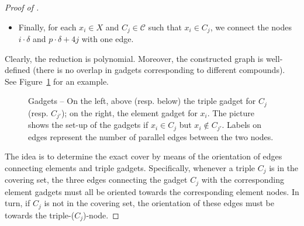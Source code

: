 \documentclass[a4paper]{article}
\begin{document}
\begin{proof}[Proof of ]
\begin{itemize}
    \item Finally, for each $x_i\in X$ and $C_j\in\mathcal{C}$ such that $x_i\in C_j$, we connect the nodes $i\cdot\delta$ and $p\cdot\delta + 4j$ with one edge.
\end{itemize}
Clearly, the reduction is polynomial. Moreover, the constructed graph is well-defined (there is no overlap in gadgets corresponding to different compounds). See Figure~\ref{fig::gadgets} for an example.
\begin{figure}[h]
\centering
  \scalebox{0.65}
  {
  }
  \caption{Gadgets -- On the left, above (resp. below) the triple gadget for $C_j$ (resp. $C_{j'}$); on the right, the element gadget for $x_i$. The picture shows the set-up of the gadgets if $x_i \in C_j$ but $x_i \notin C_{j'}$. Labels on edges represent the number of parallel edges between the two nodes.}
  \label{fig::gadgets}
 \end{figure}

The idea is to determine the exact cover by means of the orientation of edges connecting elements and triple gadgets. Specifically, whenever a triple $C_j$ is in the covering set, the three edges connecting the gadget $C_j$ with the corresponding element gadgets
must all be oriented towards the corresponding element nodes. In turn, if $C_j$ is not in the covering set, the orientation of these edges must be towards the triple-($C_j$)-node.


\end{proof}
\end{document}

